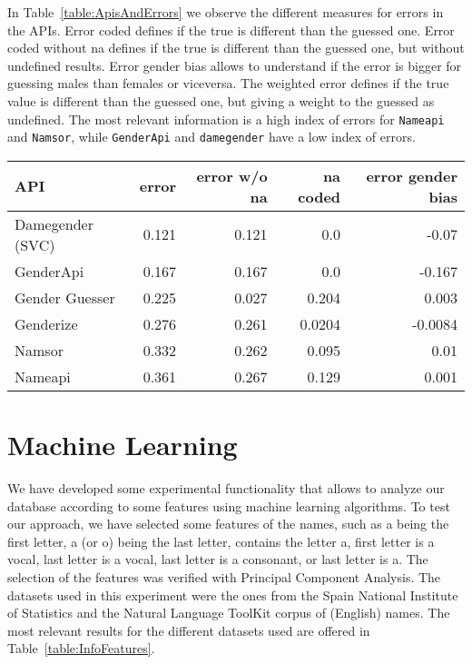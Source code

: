 \documentclass[a4paper]{article}
\begin{document}
In Table~\ref{table:ApisAndErrors} we observe the different measures for errors in the APIs.
Error coded defines if the true is different than the guessed one. 
Error coded without na defines if the true is different than the guessed one, but without undefined results.
Error gender bias allows to understand if the error is bigger for guessing males than females or viceversa.
The weighted error defines if the true value is different than the guessed one, but giving a weight to the guessed as undefined.
The most relevant information is a high index of errors for \texttt{Nameapi} and \texttt{Namsor},
while \texttt{GenderApi} and \texttt{damegender} have a low index of errors.

\begin{table*}
\footnotesize
\center
\begin{tabular}[]{lrrrr}
\hline
API & error & error w/o na & na coded & error gender bias\tabularnewline
\hline
Damegender (SVC)\footnotemark[1] & 0.121 & 0.121 & 0.0 & -0.07\tabularnewline
GenderApi & 0.167 & 0.167 & 0.0 & -0.167\tabularnewline
Gender Guesser & 0.225 & 0.027 & 0.204 & 0.003\tabularnewline
Genderize & 0.276 & 0.261 & 0.0204 & -0.0084 \tabularnewline 
Namsor & 0.332 & 0.262 & 0.095 & 0.01 \tabularnewline
Nameapi & 0.361 & 0.267 & 0.129 & 0.001 \tabularnewline
\hline
\end{tabular}
\caption{APIs and Errors}
\label{table:ApisAndErrors}
\end{table*}


\section{Machine Learning}

We have developed some experimental functionality that allows to analyze our database according to some features using machine learning algorithms.
To test our approach, we have selected some features of the names, such as a being the first letter, a (or o) being the last letter, contains the letter a, first letter is a vocal, last letter is a vocal, last letter is a consonant, or last letter is a. 
The selection of the features was verified with Principal Component Analysis.
The datasets used in this experiment were the ones from the Spain National Institute of Statistics and the Natural Language
ToolKit corpus of (English) names.
The most relevant results for the different datasets used are offered in Table~\ref{table:InfoFeatures}.
\end{document}
